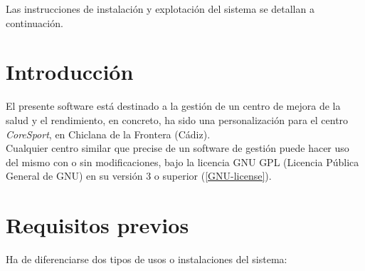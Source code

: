 

Las instrucciones de instalación y explotación del sistema se detallan a continuación.

\section{Introducción}

El presente software está destinado a la gestión de un centro de mejora de la salud y el rendimiento, en concreto, ha sido una personalización para el centro \textit{CoreSport}, en Chiclana de la Frontera (Cádiz). \\

Cualquier centro similar que precise de un software de gestión puede hacer uso del mismo con o sin modificaciones, bajo la licencia GNU GPL (Licencia Pública General de GNU) en su versión 3 o superior (\ref{GNU-license}). 


\section{Requisitos previos}

Ha de diferenciarse dos tipos de usos o instalaciones del sistema: 

